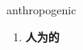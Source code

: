 
\begin{frame}
{\huge anthropogenic}
\begin{center}
\begin{enumerate}\Large
  \item \textbf{人为的}
\end{enumerate}
\end{center}
\end{frame}
